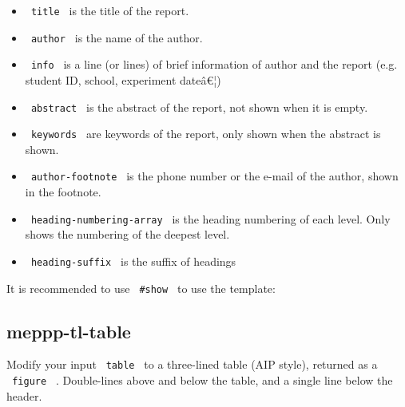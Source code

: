 \begin{itemize}
\tightlist
\item
  \texttt{\ title\ } is the title of the report.
\item
  \texttt{\ author\ } is the name of the author.
\item
  \texttt{\ info\ } is a line (or lines) of brief information of author
  and the report (e.g. student ID, school, experiment dateâ€¦)
\item
  \texttt{\ abstract\ } is the abstract of the report, not shown when it
  is empty.
\item
  \texttt{\ keywords\ } are keywords of the report, only shown when the
  abstract is shown.
\item
  \texttt{\ author-footnote\ } is the phone number or the e-mail of the
  author, shown in the footnote.
\item
  \texttt{\ heading-numbering-array\ } is the heading numbering of each
  level. Only shows the numbering of the deepest level.
\item
  \texttt{\ heading-suffix\ } is the suffix of headings
\end{itemize}

It is recommended to use \texttt{\ \#show\ } to use the template:

\begin{Shaded}
\begin{Highlighting}[]
\NormalTok{)}
\end{Highlighting}
\end{Shaded}

\subsection{meppp-tl-table}\label{meppp-tl-table}

Modify your input \texttt{\ table\ } to a three-lined table (AIP style),
returned as a \texttt{\ figure\ } . Double-lines above and below the
table, and a single line below the header.

\begin{Shaded}
\begin{Highlighting}[]
\end{Highlighting}
\end{Shaded}

